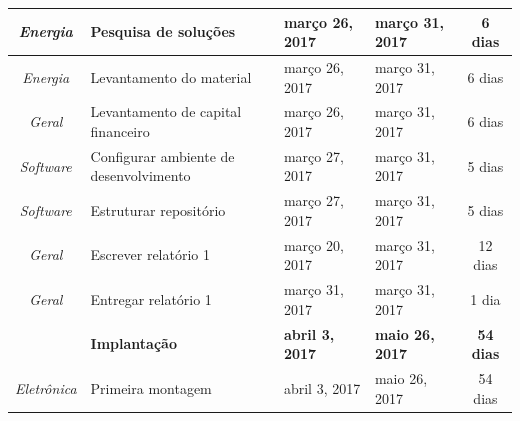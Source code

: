\begin{longtable}{|c|m{6.5cm}|m{3.2cm}|m{3.2cm}|c|}
\textit{Energia}                                                          & Pesquisa de soluções                                 & março 26, 2017                       & março 31, 2017                    & 6 dias                                \\ \hline
\textit{Energia}                                                          & Levantamento do material                             & março 26, 2017                       & março 31, 2017                    & 6 dias                                \\ \hline
\textit{Geral}                                                            & Levantamento de capital financeiro                   & março 26, 2017                       & março 31, 2017                    & 6 dias                                \\ \hline
\textit{Software}                                                         & Configurar ambiente de desenvolvimento               & março 27, 2017                       & março 31, 2017                    & 5 dias                                \\ \hline
\textit{Software}                                                         & Estruturar repositório                               & março 27, 2017                       & março 31, 2017                    & 5 dias                                \\ \hline
\textit{Geral}                                                            & Escrever relatório 1                                 & março 20, 2017                       & março 31, 2017                    & 12 dias                               \\ \hline
\textit{Geral}                                                            & Entregar relatório 1                                 & março 31, 2017                       & março 31, 2017                    & 1 dia                                 \\ \hline
\textit{}                                                                 & \textbf{Implantação}                                 & \textbf{abril 3, 2017}               & \textbf{maio 26, 2017}            & \textbf{54 dias}                      \\ \hline
\textit{Eletrônica}                                                       & Primeira montagem                                    & abril 3, 2017                        & maio 26, 2017                     & 54 dias                               \\ \hline

\end{longtable}
